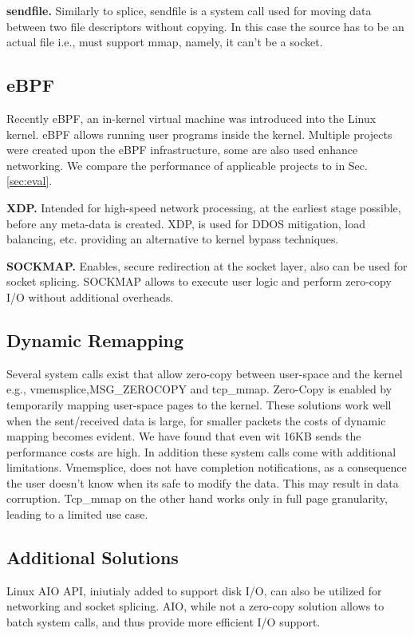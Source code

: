 \noindent\textbf{sendfile\cite{sendfile}.}
Similarly to splice, sendfile is a system call used for moving data between two file descriptors without copying. In this case the source has to be an actual file i.e., must support mmap, namely, it can't be a socket.

\subsection{eBPF}
Recently eBPF\cite{ebpf}, an in-kernel virtual machine was introduced into the Linux kernel. eBPF allows running user programs inside the kernel. Multiple projects\cite{ebpf_2} were created upon the eBPF infrastructure, some are also used enhance networking. We compare the performance of applicable projects to \oursys in Sec. \ref{sec:eval}.

\noindent \textbf{XDP\cite{xdp}.} Intended for high-speed network processing, at the earliest stage possible, before any meta-data is created. XDP, is used for DDOS mitigation, load balancing, etc. providing an alternative to kernel bypass techniques. 


\noindent \textbf{SOCKMAP\cite{sockmap}.} Enables, secure redirection at the socket layer, also can be used for socket splicing\cite{cloudflare_sockmap}. SOCKMAP allows to execute user logic and perform zero-copy I/O without additional overheads.

\subsection{Dynamic Remapping}
Several system calls exist that allow zero-copy between user-space and the kernel e.g., vmemsplice\cite{vmsplice},MSG\_ZEROCOPY\cite{desendmsg} and tcp\_mmap\cite{tcp_mmap}.
Zero-Copy is enabled by temporarily mapping user-space pages to the kernel. These solutions work well when the sent/received data is large, for smaller packets the costs of dynamic mapping becomes evident. We have found that even wit 16KB sends the performance costs are high. In addition these system calls come with additional limitations. Vmemsplice, does not have completion notifications, as a consequence the user doesn't know when its safe to modify the data. This may result in data corruption. Tcp\_mmap on the other hand works only in full page granularity, leading to a limited use case. 

\subsection{Additional Solutions}
Linux AIO API\cite{aio}, iniutialy added to support disk I/O, can also be utilized for networking and socket splicing\cite{cloudflare_aio}. AIO, while not a zero-copy solution allows to batch system calls, and thus provide more efficient I/O support.


